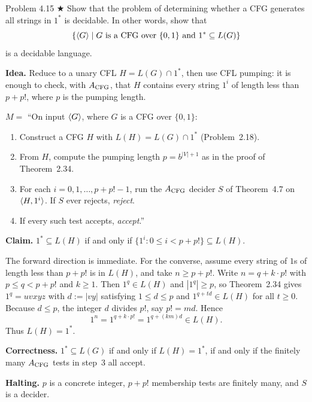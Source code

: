 \begin{question}{Problem 4.15 $\bigstar$}
Show that the problem of determining whether a CFG generates all strings in $1^*$ is decidable. In other words, show that
\[
\{\langle G\rangle\mid\text{$G$ is a CFG over $\{0,1\}$ and }1^*\subseteq L(G)\}
\]
is a decidable language.
\end{question}
\begin{soln}
\textbf{Idea.} Reduce to a unary CFL $H=L(G)\cap 1^*$, then use CFL pumping: it is enough to check, with $A_{\mathrm{CFG}}$, that $H$ contains every string $1^i$ of length less than $p+p!$, where $p$ is the pumping length.

$M=$ ``On input $\langle G\rangle$, where $G$ is a CFG over $\{0,1\}$:
\begin{enumerate}
\item Construct a CFG $H$ with $L(H)=L(G)\cap 1^*$ (Problem~2.18).
\item From $H$, compute the pumping length $p=b^{|V|+1}$ as in the proof of Theorem~2.34.
\item For each $i=0,1,\dots,p+p!-1$, run the $A_{\mathrm{CFG}}$ decider $S$ of Theorem~4.7 on $\langle H,1^i\rangle$. If $S$ ever rejects, \emph{reject}.
\item If every such test accepts, \emph{accept}.''
\end{enumerate}

\textbf{Claim.} $1^*\subseteq L(H)$ if and only if $\{1^i:0\le i<p+p!\}\subseteq L(H)$.

The forward direction is immediate. For the converse, assume every string of $1$s of length less than $p+p!$ is in $L(H)$, and take $n\ge p+p!$. Write $n=q+k\cdot p!$ with $p\le q<p+p!$ and $k\ge 1$. Then $1^q\in L(H)$ and $|1^q|\ge p$, so Theorem~2.34 gives $1^q=uvxyz$ with $d:=|vy|$ satisfying $1\le d\le p$ and $1^{q+td}\in L(H)$ for all $t\ge 0$. Because $d\le p$, the integer $d$ divides $p!$, say $p!=md$. Hence
\[
1^n=1^{q+k\cdot p!}=1^{q+(km)d}\in L(H).
\]
Thus $L(H)=1^*$.

\textbf{Correctness.} $1^*\subseteq L(G)$ if and only if $L(H)=1^*$, if and only if the finitely many $A_{\mathrm{CFG}}$ tests in step~3 all accept.

\textbf{Halting.} $p$ is a concrete integer, $p+p!$ membership tests are finitely many, and $S$ is a decider.
\end{soln}

